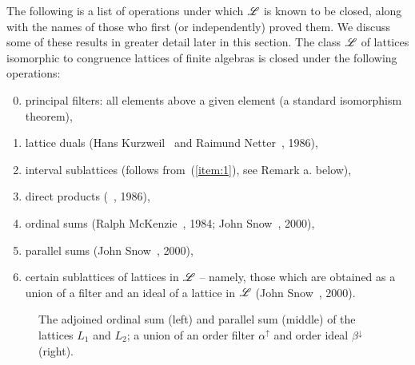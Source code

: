 The following is a list of operations under which $\mathscr{L}$ is known to be closed,
along with the names of those who first (or independently) proved them.  We
discuss some of these results in greater detail later in this section.
The class $\mathscr{L}$ of lattices isomorphic to congruence lattices of finite
algebras is closed under the following operations:
\begin{enumerate} %
\setcounter{enumi}{-1}
\item\label{item:0} principal filters: all elements above a given element (a 
standard isomorphism theorem),
\item\label{item:1} lattice duals (Hans Kurzweil~\cite{Kurzweil:1985} and Raimund Netter~\cite{Netter:1986}, 1986),
\item\label{item:2} interval sublattices (follows from~(\ref{item:1}), see Remark a. below),
\item  direct products (\Jiri \Tuma~\cite{Tuma:1986}, 1986), 
\item  ordinal sums 
  (Ralph McKenzie~\cite{McKenzie:1984}, 1984; John Snow~\cite{Snow:2000}, 2000),
\item  parallel sums (John Snow~\cite{Snow:2000}, 2000), 
\item\label{item:6} certain sublattices of lattices in $\mathscr{L}$ -- namely, those which
  are obtained as a union of a filter and an ideal of a lattice in
  $\mathscr{L}$ (John Snow~\cite{Snow:2000}, 2000). 
\end{enumerate}
\begin{center}
  \begin{figure}[h!]
    \centering
    \hskip5mm
    \hskip5mm
    \caption{The adjoined ordinal sum (left) and parallel sum (middle) 
      of the lattices $L_1$ and $L_2$; a union of an order filter
      $\alpha^\uparrow$ and order ideal $\beta^\downarrow$ (right).}
    \label{fig:ord_par_fil-uni}
  \end{figure}
\end{center}

